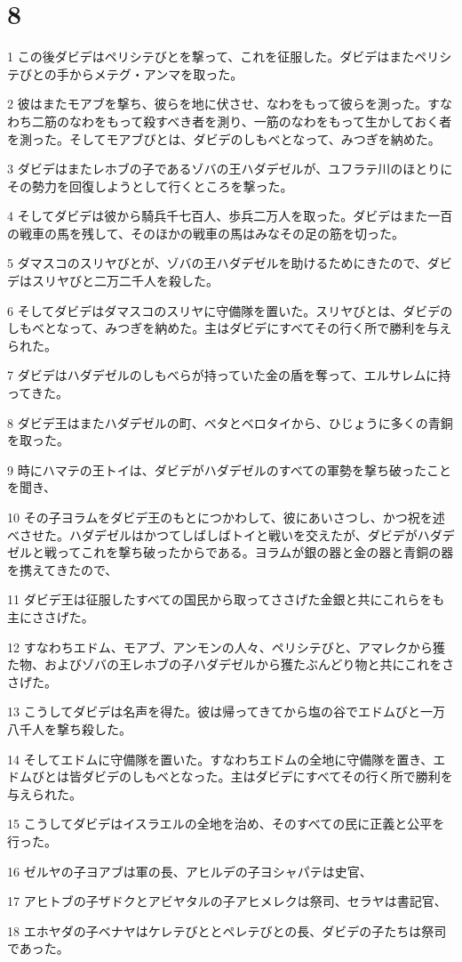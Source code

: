 \chapter{8}

\par 1 この後ダビデはペリシテびとを撃って、これを征服した。ダビデはまたペリシテびとの手からメテグ・アンマを取った。
\par 2 彼はまたモアブを撃ち、彼らを地に伏させ、なわをもって彼らを測った。すなわち二筋のなわをもって殺すべき者を測り、一筋のなわをもって生かしておく者を測った。そしてモアブびとは、ダビデのしもべとなって、みつぎを納めた。
\par 3 ダビデはまたレホブの子であるゾバの王ハダデゼルが、ユフラテ川のほとりにその勢力を回復しようとして行くところを撃った。
\par 4 そしてダビデは彼から騎兵千七百人、歩兵二万人を取った。ダビデはまた一百の戦車の馬を残して、そのほかの戦車の馬はみなその足の筋を切った。
\par 5 ダマスコのスリヤびとが、ゾバの王ハダデゼルを助けるためにきたので、ダビデはスリヤびと二万二千人を殺した。
\par 6 そしてダビデはダマスコのスリヤに守備隊を置いた。スリヤびとは、ダビデのしもべとなって、みつぎを納めた。主はダビデにすべてその行く所で勝利を与えられた。
\par 7 ダビデはハダデゼルのしもべらが持っていた金の盾を奪って、エルサレムに持ってきた。
\par 8 ダビデ王はまたハダデゼルの町、ベタとベロタイから、ひじょうに多くの青銅を取った。
\par 9 時にハマテの王トイは、ダビデがハダデゼルのすべての軍勢を撃ち破ったことを聞き、
\par 10 その子ヨラムをダビデ王のもとにつかわして、彼にあいさつし、かつ祝を述べさせた。ハダデゼルはかつてしばしばトイと戦いを交えたが、ダビデがハダデゼルと戦ってこれを撃ち破ったからである。ヨラムが銀の器と金の器と青銅の器を携えてきたので、
\par 11 ダビデ王は征服したすべての国民から取ってささげた金銀と共にこれらをも主にささげた。
\par 12 すなわちエドム、モアブ、アンモンの人々、ペリシテびと、アマレクから獲た物、およびゾバの王レホブの子ハダデゼルから獲たぶんどり物と共にこれをささげた。
\par 13 こうしてダビデは名声を得た。彼は帰ってきてから塩の谷でエドムびと一万八千人を撃ち殺した。
\par 14 そしてエドムに守備隊を置いた。すなわちエドムの全地に守備隊を置き、エドムびとは皆ダビデのしもべとなった。主はダビデにすべてその行く所で勝利を与えられた。
\par 15 こうしてダビデはイスラエルの全地を治め、そのすべての民に正義と公平を行った。
\par 16 ゼルヤの子ヨアブは軍の長、アヒルデの子ヨシャパテは史官、
\par 17 アヒトブの子ザドクとアビヤタルの子アヒメレクは祭司、セラヤは書記官、
\par 18 エホヤダの子ベナヤはケレテびととペレテびとの長、ダビデの子たちは祭司であった。

